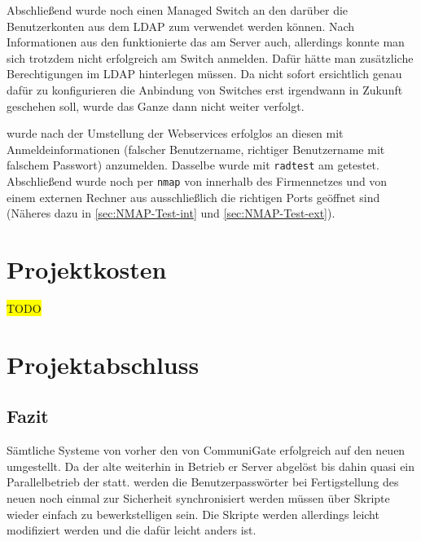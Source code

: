 \documentclass[11pt,a4paper,titlepage=firstiscover]{scrartcl} %
\newcommand{\hilight}[1]{\colorbox{yellow}{#1}} %
\begin{document}
Abschließend wurde noch  einen Managed Switch an 
den   darüber die Benutzerkonten aus 
dem LDAP zum  verwendet werden können. Nach 
Informationen aus den  funktionierte das 
 am Server auch, allerdings konnte 
man sich trotzdem nicht erfolgreich am Switch anmelden. Dafür hätte man 
zusätzliche Berechtigungen im LDAP hinterlegen müssen. Da nicht sofort 
ersichtlich  genau dafür zu konfigurieren  die 
Anbindung von Switches erst irgendwann in Zukunft geschehen soll, wurde das 
Ganze dann nicht weiter verfolgt.

\medskip \noindent
{} wurde nach der 
Umstellung der Webservices erfolglos  an diesen mit 
Anmeldeinformationen (falscher Benutzername, richtiger Benutzername mit 
falschem Passwort) anzumelden. Dasselbe wurde mit \texttt{radtest} am 
 getestet. Abschließend wurde noch per \texttt{nmap} von 
innerhalb des Firmennetzes und von einem externen Rechner aus  
 ausschließlich die richtigen Ports geöffnet sind (Näheres dazu in 
\autoref{sec:NMAP-Test-int} und \autoref{sec:NMAP-Test-ext}).

\section{Projektkosten}
\hilight{TODO}

\section{Projektabschluss}
\subsection{Fazit}
Sämtliche Systeme von  vorher den  von 
CommuniGate  erfolgreich auf den neuen 
 umgestellt. Da der alte  weiterhin in 
Betrieb  er  Server 
abgelöst  bis dahin quasi ein Parallelbetrieb der 
 statt.  werden die Benutzerpasswörter 
bei Fertigstellung des neuen  noch einmal zur Sicherheit 
synchronisiert werden müssen\tcr{,$\to$;}  über Skripte wieder einfach zu bewerkstelligen sein. Die 
 Skripte werden 
 allerdings leicht modifiziert werden   und die  dafür leicht anders ist.
\end{document}
